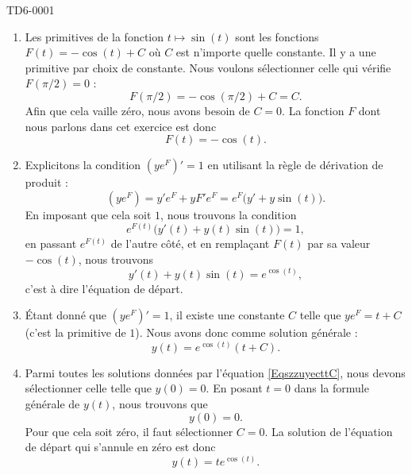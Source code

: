 
\begin{corrige}{TD6-0001}

	\begin{enumerate}
		\item
			Les primitives de la fonction $t\mapsto\sin(t)$ sont les fonctions $F(t)=-\cos(t)+C$ où $C$ est n'importe quelle constante. Il y a une primitive par choix de constante. Nous voulons sélectionner celle qui vérifie $F(\pi/2)=0$ :
			\begin{equation}
				F(\pi/2)=-\cos(\pi/2)+C=C.
			\end{equation}
			Afin que cela vaille zéro, nous avons besoin de $C=0$. La fonction $F$ dont nous parlons dans cet exercice est donc
			\begin{equation}
				F(t)=-\cos(t).
			\end{equation}
		\item
			Explicitons la condition $(y e^{F})'=1$ en utilisant la règle de dérivation de produit :
			\begin{equation}
				(y e^{F})=y' e^{F}+yF'e^F=e^F\big( y'+y\sin(t)\big).
			\end{equation}
			En imposant que cela soit $1$, nous trouvons la condition
			\begin{equation}
				e^{F(t)}\big( y'(t)+y(t)\sin(t) \big)=1,
			\end{equation}
			en passant $ e^{F(t)}$ de l'autre côté, et en remplaçant $F(t)$ par sa valeur $-\cos(t)$, nous trouvons
			\begin{equation}
				y'(t)+y(t)\sin(t)= e^{\cos(t)},
			\end{equation}
			c'est à dire l'équation de départ.
		\item
			Étant donné que $(y e^{F})'=1$, il existe une constante $C$ telle que $ye^F=t+C$ (c'est la primitive de $1$). Nous avons donc comme solution générale :
			\begin{equation}		\label{EqszzuyecttC}
				y(t)= e^{\cos(t)}(t+C).
			\end{equation}
		\item
			Parmi toutes les solutions données par l'équation \eqref{EqszzuyecttC}, nous devons sélectionner celle telle que $y(0)=0$. En posant $t=0$ dans la formule générale de $y(t)$, nous trouvons que
			\begin{equation}
				y(0)=0.
			\end{equation}
			Pour que cela soit zéro, il faut sélectionner $C=0$. La solution de l'équation de départ qui s'annule en zéro est donc
			\begin{equation}
				y(t)=t e^{\cos(t)}.
			\end{equation}
	\end{enumerate}

\end{corrige}
